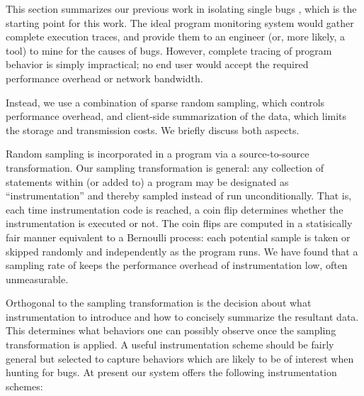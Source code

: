 \documentclass{sig-alternate}
\begin{document}
This section summarizes our previous work in isolating single bugs
\cite{PLDI`03*141,Zheng:2003:SDSP}, which is the starting point for
this work.  The ideal program monitoring system would gather complete
execution traces, and provide them to an engineer (or, more likely, a
tool) to mine for the causes of bugs.  However, complete tracing of
program behavior is simply impractical; no end user would accept the
required performance overhead or network bandwidth.

Instead, we use a combination of sparse random sampling, which controls
performance overhead, and client-side summarization of the data, which
limits the storage and transmission costs.  We briefly discuss
both aspects.

Random sampling is incorporated in a program via a source-to-source transformation.
Our sampling transformation is general: any collection of
statements within (or added to) a program may be designated as
``instrumentation'' and thereby sampled instead of run
unconditionally.  That is, each time instrumentation code is reached,
a coin flip determines whether the instrumentation is executed or not.
The coin flips are computed in a statisically fair
manner equivalent to a Bernoulli process: each potential sample is
taken or skipped randomly and independently as the program runs.
We have found that a sampling rate of  keeps the performance overhead 
of instrumentation low, often unmeasurable.

Orthogonal to the sampling transformation is the decision about what
instrumentation to introduce and how to concisely
summarize the resultant data.  This determines what behaviors one can
possibly observe once the sampling transformation is applied.  A useful instrumentation
scheme should be fairly general but selected to capture behaviors
which are likely to be of interest when hunting for bugs.  At present
our system offers the following instrumentation schemes:
\end{document}
